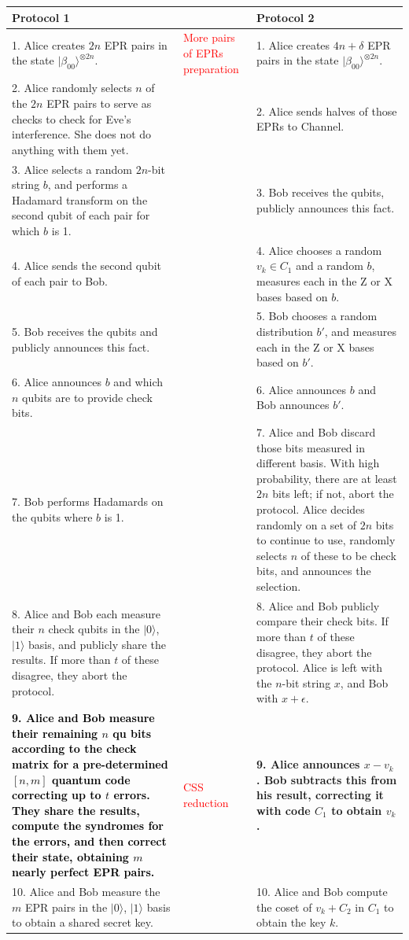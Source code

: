 \documentclass{report}
\theoremstyle{defn_style}
\begin{document}
\begin{center}
\begin{longtable}{|p{6cm}|p{4cm}|p{6cm}|}
\hline
\textbf{Protocol 1} & & \textbf{Protocol 2} \\
\hline
1. Alice creates $2n$ EPR pairs in the state $|\beta_{00}\rangle^{\otimes 2n}$. & \textcolor{red}{More pairs of EPRs preparation} & 
1. Alice creates $4n+\delta$ EPR pairs in the state $|\beta_{00}\rangle^{\otimes 2n}$. \\
\hline
2. Alice randomly selects $n$ of the $2n$ EPR pairs to serve as checks to check for Eve’s interference. She does not do anything with them yet. & &  
2. Alice sends halves of those EPRs to Channel. \\
\hline
3. Alice selects a random $2n$-bit string $b$, and performs a Hadamard transform on the second qubit of each pair for which $b$ is 1. & & 
3. Bob receives the qubits, publicly announces this fact. \\
\hline
4. Alice sends the second qubit of each pair to Bob. & & 
4. Alice chooses a random $v_k \in C_1$ and a random $b$, measures each in the Z or X bases based on $b$. \\
\hline
5. Bob receives the qubits and publicly announces this fact. & & 
5. Bob chooses a random distribution  $b'$, and measures each in the Z or X bases based on $b'$. \\
\hline
6. Alice announces $b$ and which $n$ qubits are to provide check bits. & & 
6. Alice announces $b$ and Bob announces $b'$. \\
\hline
7. Bob performs Hadamards on the qubits where $b$ is 1. & & 
7. Alice and Bob discard those bits measured in different basis. With high probability, there are at least $2n$ bits left; if not, abort the protocol. Alice decides randomly on a set of $2n$ bits to continue to use, randomly selects $n$ of these to be check bits, and announces the selection. \\
\hline

8. Alice and Bob each measure their $n$ check qubits in the $|0\rangle$, $|1\rangle$ basis, and publicly share the results. If more than $t$ of these disagree, they abort the protocol. & & 
8. Alice and Bob publicly compare their check bits. If more than $t$ of these disagree, they abort the protocol. Alice is left with the $n$-bit string $x$, and Bob with $x + \epsilon$. \\
\hline
\textbf{\textcolor{black}{9. Alice and Bob measure their remaining $n$ qu
bits according to the check matrix for a pre-determined $[n, m]$ quantum code correcting up to $t$ errors. They share the results, compute the syndromes for the errors, and then correct their state, obtaining $m$ nearly perfect EPR pairs.}} &\textcolor{red}{CSS reduction} & 
\textbf{{9. Alice announces $x - v_k$. Bob subtracts this from his result, correcting it with code $C_1$ to obtain $v_k$. }} \\
\hline
10. Alice and Bob measure the $m$ EPR pairs in the $|0\rangle$, $|1\rangle$ basis to obtain a shared secret key. & & 
10. Alice and Bob compute the coset of $v_k + C_2$ in $C_1$ to obtain the key $k$. \\
\hline
\end{longtable}
\end{center}
\end{document}
